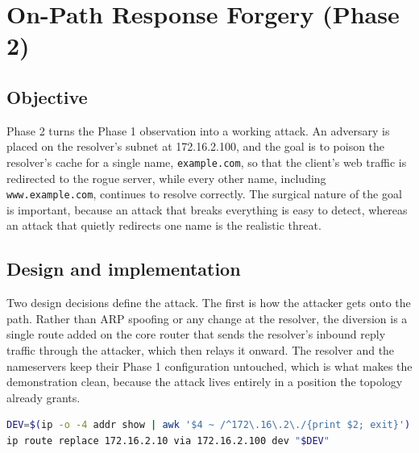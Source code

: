 \documentclass[11pt]{article}
\begin{document}

\clearpage

\section{On-Path Response Forgery (Phase 2)}

\subsection{Objective}

Phase 2 turns the Phase 1 observation into a working attack. An adversary is
placed on the resolver's subnet at 172.16.2.100, and the goal is to poison the
resolver's cache for a single name, \texttt{example.com}, so that the client's web
traffic is redirected to the rogue server, while every other name, including
\texttt{www.example.com}, continues to resolve correctly. The surgical nature of
the goal is important, because an attack that breaks everything is easy to detect,
whereas an attack that quietly redirects one name is the realistic threat.

\subsection{Design and implementation}

Two design decisions define the attack. The first is how the attacker gets onto
the path. Rather than ARP spoofing or any change at the resolver, the diversion is
a single route added on the core router that sends the resolver's inbound reply
traffic through the attacker, which then relays it onward. The resolver and the
nameservers keep their Phase 1 configuration untouched, which is what makes the
demonstration clean, because the attack lives entirely in a position the topology
already grants.

\begin{lstlisting}[language=bash,caption={The Phase 2 diversion on the core router, which finds the resolver-facing interface by its address so nothing is hard-coded (scripts/divert-on.sh). The resolver's own configuration is never touched.}]
DEV=$(ip -o -4 addr show | awk '$4 ~ /^172\.16\.2\./{print $2; exit}')
ip route replace 172.16.2.10 via 172.16.2.100 dev "$DEV"
\end{lstlisting}
\end{document}
